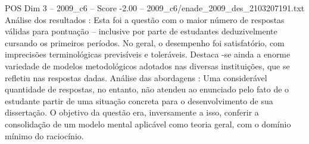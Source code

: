 \begin{textsample}{POS Dim 3 – 2009\_c6 – Score -2.00 – 2009\_c6/enade\_2009\_des\_2103207191.txt}
Análise dos resultados : Esta foi a questão com o maior número de respostas válidas para pontuação – inclusive por parte de estudantes deduzivelmente cursando os primeiros períodos.
No geral, o desempenho foi satisfatório, com imprecisões terminológicas previsíveis e toleráveis.
Destaca -se ainda a enorme variedade de modelos metodológicos adotados nas diversas instituições, que se refletiu nas respostas dadas.
Análise das abordagens : Uma considerável quantidade de respostas, no entanto, não atendeu ao enunciado pelo fato de o estudante partir de uma situação concreta para o desenvolvimento de sua dissertação.
O objetivo da questão era, inversamente a isso, conferir a consolidação de um modelo mental aplicável como teoria geral, com o domínio mínimo do raciocínio.

\end{textsample}
